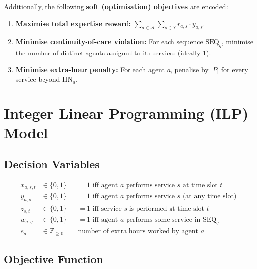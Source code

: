\documentclass[11pt,a4paper]{article}
\newcommand{\setA}{\mathcal{A}}
\newcommand{\setS}{\mathcal{S}}
\newcommand{\SEQ}{\mathrm{SEQ}}
\newcommand{\HN}{\mathrm{HN}}
\begin{document}
\noindent
Additionally, the following \textbf{soft (optimisation) objectives} are encoded:

\begin{enumerate}[label=\textbf{O\arabic*.}]
    \item \textbf{Maximise total expertise reward:}
    $\displaystyle\sum_{a \in \setA}\sum_{s \in \setS} r_{a,s} \cdot y_{a,s}$.

    \item \textbf{Minimise continuity-of-care violation:}
    For each sequence $\SEQ_q$, minimise the number of distinct agents assigned
    to its services (ideally 1).

    \item \textbf{Minimise extra-hour penalty:}
    For each agent $a$, penalise by $|P|$ for every service beyond $\HN_a$.
\end{enumerate}


\section{Integer Linear Programming (ILP) Model}\label{sec:ilp}

\subsection{Decision Variables}

\begin{align}
    x_{a,s,t} &\in \{0,1\}
    && \text{$= 1$ iff agent $a$ performs service $s$ at time slot $t$} \label{eq:x}\\
    y_{a,s} &\in \{0,1\}
    && \text{$= 1$ iff agent $a$ performs service $s$ (at any time slot)} \label{eq:y}\\
    z_{s,t} &\in \{0,1\}
    && \text{$= 1$ iff service $s$ is performed at time slot $t$} \label{eq:z}\\
    w_{a,q} &\in \{0,1\}
    && \text{$= 1$ iff agent $a$ performs some service in $\SEQ_q$} \label{eq:w}\\
    e_a &\in \mathbb{Z}_{\ge 0}
    && \text{number of extra hours worked by agent $a$} \label{eq:e}
\end{align}

\subsection{Objective Function}
\end{document}
